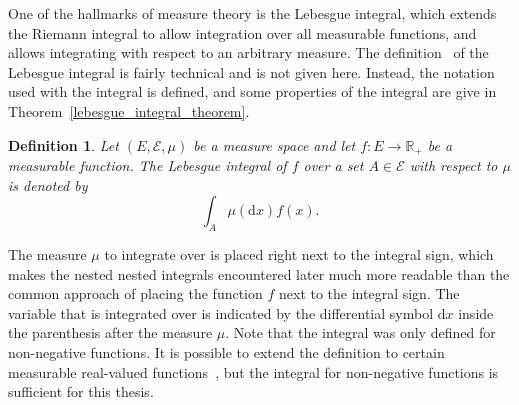 \documentclass[english,twoside,openright]{HYgraduMLDS}
\newtheorem{definition}[lemma]{Definition}
\newcommand{\R}{\mathbb{R}}
\newcommand{\dx}{\mathrm{d}}
\begin{document}
One of the hallmarks of measure theory is the Lebesgue integral, which
extends the Riemann integral to allow integration over all measurable functions,
and allows integrating with respect to an arbitrary measure. The
definition~\cite[Definition 4.3]{Cin11}
of the Lebesgue integral is fairly technical and is not given here. Instead,
the notation used with the integral is defined, and some properties of the
integral are give in Theorem~\ref{lebesgue_integral_theorem}.

\begin{definition}
	Let \((E, \mathcal{E}, \mu)\) be a measure space and let \(f\colon E\to \R_{+}\)
  be a measurable function. The Lebesgue integral of \(f\) over a set
  \(A\in \mathcal{E}\) with respect to \(\mu\) is denoted by
  \[
    \int_{A}\mu(\dx x)f(x).
  \]
\end{definition}
The measure \(\mu\) to integrate over is placed right next to the integral sign, which
makes the nested nested integrals encountered later much more readable than the
common approach of placing
the function \(f\) next to the integral sign. The variable that is integrated
over is indicated by the differential symbol \(\dx x\) inside the parenthesis
after the measure \(\mu\).
Note that the integral was only defined for non-negative functions. It is possible
to extend the definition to certain measurable real-valued functions~\cite{Cin11},
but the integral for non-negative functions is sufficient for this thesis.
\end{document}
